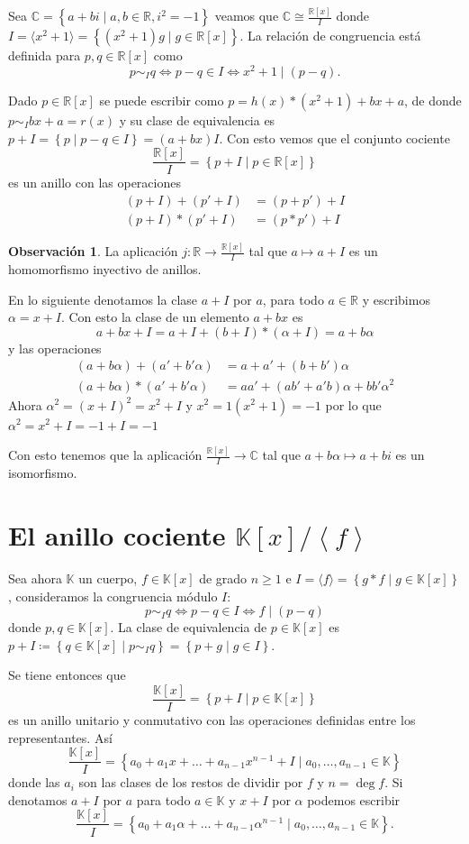 \documentclass[10pt, spanish]{report}
\theoremstyle{definition}
\newtheorem*{obs}{Observación}
\newcommand{\R}{\mathbb{R}}
\newcommand{\C}{\mathbb{C}}
\newcommand{\K}{\mathbb{K}}
\renewcommand{\geq}{\geqslant}
\begin{document}
Sea $\C =\left\{ a+bi\mid a,b\in\R, i^2 = -1 \right\}$ veamos que $\C\cong
\frac{\R[x]}{I}$ donde $I=\langle x^2 +1\rangle=\left\{(x^2+1)g\mid g\in\R[x]
\right\}$. La relación de congruencia está definida para $p,q\in\R[x]$ como
\[p\sim_I q \Leftrightarrow p-q\in I\Leftrightarrow x^2+1\mid(p-q).\]

Dado $p\in\R[x]$ se puede escribir como $p=h(x)*(x^2+1)+bx+a$, de donde
$p\sim_I bx+a=r(x)$ y su clase de equivalencia es $p+I=\left\{ p\mid p-q\in
I\right\}=(a+bx)I$. Con esto vemos que el conjunto cociente
\[\frac{\R[x]}{I}=\left\{ p+I\mid p\in\R[x] \right\} \]
es un anillo con las operaciones
\begin{align*}
    (p+I)+(p'+I)&=(p+p')+I\\
    (p+I)*(p'+I)&=(p*p')+I
\end{align*}

\begin{obs}
    La aplicación $j:\R\to\frac{\R[x]}{I}$ tal que $a\mapsto a+I$ es un
    homomorfismo inyectivo de anillos.
\end{obs}

En lo siguiente denotamos la clase $a+I$ por $a$, para todo $a\in\R$ y
escribimos $\alpha = x+I$. Con esto la clase de un elemento $a+bx$ es
\[a+bx+I=a+I+(b+I)*(\alpha+I)=a+b\alpha\]
y las operaciones
\begin{align*}
    (a+b\alpha)+(a'+b'\alpha)&=a+a'+(b+b')\alpha\\
    (a+b\alpha)*(a'+b'\alpha)&=aa'+(ab'+a'b)\alpha+bb'\alpha^2
\end{align*}
Ahora $\alpha^2=(x+I)^2=x^2+I$ y $x^2=1(x^2+1)=-1$ por lo que $\alpha^2=x^2+I
=-1+I=-1$

Con esto tenemos que la aplicación $\frac{\R[x]}{I}\to \C$ tal que
$a+b\alpha\mapsto a+bi$ es un isomorfismo.

\section{El anillo cociente $\K[x]/\left<f\right>$}

Sea ahora $\K$ un cuerpo, $f\in\K[x]$ de grado $n\geq 1$ e $I=\langle f\rangle=
\left\{ g*f\mid g\in\K[x] \right\}$, consideramos la congruencia módulo $I$:
\[p\sim_I q\Leftrightarrow p-q\in I \Leftrightarrow f\mid(p-q)\]
donde $p,q\in\K[x]$. La clase de equivalencia de $p\in\K[x]$ es
$p+I\coloneqq\left\{q\in\K[x]\mid p\sim_Iq\right\}=\left\{p+g\mid g\in I\right\}$.

Se tiene entonces que \[\frac{\K[x]}{I}=\left\{ p+I\mid p\in\K[x] \right\}\] es un
anillo unitario y conmutativo con las operaciones definidas entre los
representantes. Así
\[\frac{\K[x]}{I}=\left\{ a_0+a_1x+\ldots+a_{n-1}x^{n-1}+I\mid a_0,\ldots,a_{n-1}
\in\K \right\}\]
donde las $a_i$ son las clases de los restos de dividir por $f$ y $n=\deg{f}$.
Si denotamos $a+I$ por $a$ para todo $a\in\K$ y $x+I$ por $\alpha$ podemos
escribir
\[\frac{\K[x]}{I}=\left\{ a_0+a_1\alpha+\ldots+a_{n-1}\alpha^{n-1}\mid a_0,\ldots,a_{n-1}
\in\K \right\}.\]
\end{document}
